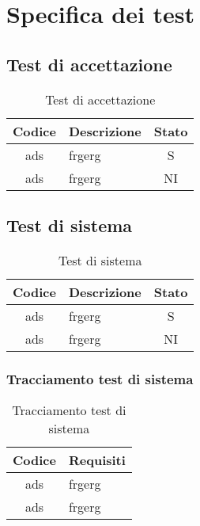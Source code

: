 \section{Specifica dei test}\label{section:specifica_test}

\subsection{Test di accettazione}\label{subsection:test_accettazione}
\begin{table}[H]
  \centering
  \renewcommand{\arraystretch}{1.8}
  \begin{tabular}{c|p{8cm}|c}
    \rowcolor[HTML]{125E28}
    \color[HTML]{FFFFFF}\textbf{Codice}
    & \multicolumn{1}{c}{\color[HTML]{FFFFFF}\textbf{Descrizione}}
    & \color[HTML]{FFFFFF}\textbf{Stato}\\
    \hline
    ads & frgerg & S\\
    ads & frgerg & NI \\
  \end{tabular}
  \caption{Test di accettazione}
\end{table}
\subsection{Test di sistema}\label{subsection:test_sistema}
\begin{table}[H]
  \centering
  \renewcommand{\arraystretch}{1.8}
  \begin{tabular}{c|p{8cm}|c}
    \rowcolor[HTML]{125E28}
    \color[HTML]{FFFFFF}\textbf{Codice}
    & \multicolumn{1}{c}{\color[HTML]{FFFFFF}\textbf{Descrizione}}
    & \color[HTML]{FFFFFF}\textbf{Stato}\\
    \hline
    ads & frgerg & S\\
    ads & frgerg & NI \\
  \end{tabular}
  \caption{Test di sistema}
\end{table}

\subsubsection{Tracciamento test di sistema}\label{subsubsection:tracciamento_test_sistema}
\begin{table}[H]
  \centering
  \renewcommand{\arraystretch}{1.8}
  \begin{tabular}{c|l}
    \rowcolor[HTML]{125E28}
    \color[HTML]{FFFFFF}\textbf{Codice}
    & \multicolumn{1}{c}{\color[HTML]{FFFFFF}\textbf{Requisiti}}\\
    \hline
    ads & frgerg \\
    ads & frgerg \\
  \end{tabular}
  \caption{Tracciamento test di sistema}
\end{table}

